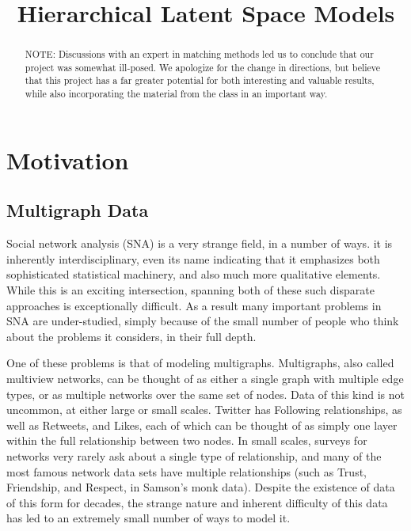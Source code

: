 \documentclass[11pt]{scrartcl}
\title{Hierarchical Latent Space Models}
\begin{document}
\maketitle

\begin{abstract}
NOTE: Discussions with an expert in matching methods led us to conclude that our project was somewhat ill-posed. We apologize for the change in directions, but believe that this project has a far greater potential for both interesting and valuable results, while also incorporating the material from the class in an important way.
\end{abstract}

\section{Motivation}
\subsection{Multigraph Data}
Social network analysis (SNA) is a very strange field, in a number of ways. it is inherently interdisciplinary, even its name indicating that it emphasizes both sophisticated statistical machinery, and also much more qualitative elements. While this is an exciting intersection, spanning both of these such disparate approaches is exceptionally difficult. As a result many important problems in SNA are under-studied, simply because of the small number of people who think about the problems it considers, in their full depth.

One of these problems is that of modeling multigraphs. Multigraphs, also called multiview networks, can be thought of as either a single graph with multiple edge types, or as multiple networks over the same set of nodes. Data of this kind is not uncommon, at either large or small scales. Twitter has Following relationships, as well as Retweets, and Likes, each of which can be thought of as simply one layer within the full relationship between two nodes. In small scales, surveys for networks very rarely ask about a single type of relationship, and many of the most famous network data sets have multiple relationships (such as Trust, Friendship, and Respect, in Samson's monk data). Despite the existence of data of this form for decades, the strange nature and inherent difficulty of this data has led to an extremely small number of ways to model it.
\end{document}
